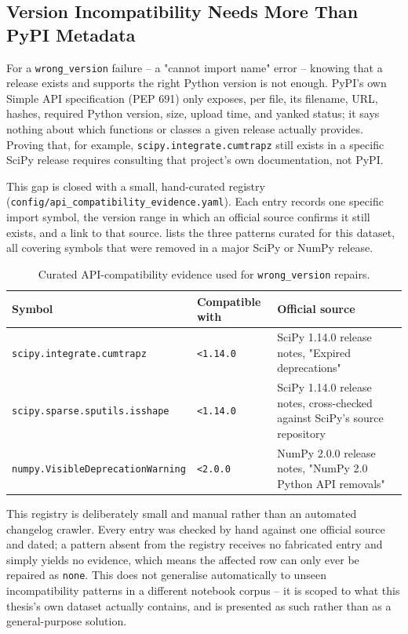 \subsection{Version Incompatibility Needs More Than PyPI Metadata}
\label{sec:m-repair-compat}

For a \texttt{wrong\_version} failure -- a "cannot import name" error --
knowing that a release exists and supports the right Python version is not
enough. PyPI's own Simple API specification (PEP 691) only exposes, per
file, its filename, URL, hashes, required Python version, size, upload
time, and yanked status; it says nothing about which functions or classes a
given release actually provides. Proving that, for example,
\texttt{scipy.integrate.cumtrapz} still exists in a specific SciPy release
requires consulting that project's own documentation, not PyPI.

This gap is closed with a small, hand-curated registry
(\texttt{config/}\allowbreak\texttt{api\_compatibility\_evidence.yaml}). Each entry records one
specific import symbol, the version range in which an official source
confirms it still exists, and a link to that source. 
lists the three patterns curated for this dataset, all covering symbols
that were removed in a major SciPy or NumPy release.

\begin{table}[h]
  \centering
  \begin{tabular}{|p{4.4cm}|p{1.6cm}|p{6.0cm}|}
    \hline
    \textbf{Symbol} & \textbf{Compatible with} & \textbf{Official source} \\
    \hline
    \texttt{scipy.integrate.\allowbreak cumtrapz} & \texttt{<1.14.0} & SciPy 1.14.0 release notes, "Expired deprecations" \\
    \hline
    \texttt{scipy.sparse.\allowbreak sputils.\allowbreak isshape} & \texttt{<1.14.0} & SciPy 1.14.0 release notes, cross-checked against SciPy's source repository \\
    \hline
    \texttt{numpy.\allowbreak VisibleDeprecationWarning} & \texttt{<2.0.0} & NumPy 2.0.0 release notes, "NumPy 2.0 Python API removals" \\
    \hline
  \end{tabular}
  \caption{Curated API-compatibility evidence used for \texttt{wrong\_version} repairs.}
  \label{tab:m-compat}
\end{table}

This registry is deliberately small and manual rather than an automated
changelog crawler. Every entry was checked by hand against one official
source and dated; a pattern absent from the registry receives no fabricated
entry and simply yields no evidence, which means the affected row can only
ever be repaired as \texttt{none}. This does not generalise automatically
to unseen incompatibility patterns in a different notebook corpus -- it is
scoped to what this thesis's own dataset actually contains, and is
presented as such rather than as a general-purpose solution.

